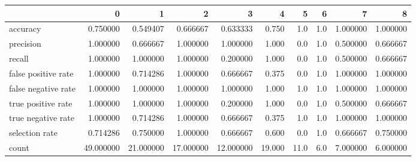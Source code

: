 \begin{tabular}{lrrrrrrrrr}
\toprule
{} &          0 &          1 &          2 &          3 &       4 &     5 &    6 &         7 &         8 \\
\midrule
accuracy            &   0.750000 &   0.549407 &   0.666667 &   0.633333 &   0.750 &   1.0 &  1.0 &  1.000000 &  1.000000 \\
precision           &   1.000000 &   0.666667 &   1.000000 &   1.000000 &   1.000 &   0.0 &  1.0 &  0.500000 &  0.666667 \\
recall              &   1.000000 &   1.000000 &   1.000000 &   0.200000 &   1.000 &   0.0 &  1.0 &  0.500000 &  0.666667 \\
false positive rate &   1.000000 &   0.714286 &   1.000000 &   0.666667 &   0.375 &   0.0 &  1.0 &  1.000000 &  1.000000 \\
false negative rate &   1.000000 &   1.000000 &   1.000000 &   1.000000 &   1.000 &   1.0 &  1.0 &  1.000000 &  1.000000 \\
true positive rate  &   1.000000 &   1.000000 &   1.000000 &   0.200000 &   1.000 &   0.0 &  1.0 &  0.500000 &  0.666667 \\
true negative rate  &   1.000000 &   0.714286 &   1.000000 &   0.666667 &   0.375 &   1.0 &  1.0 &  1.000000 &  1.000000 \\
selection rate      &   0.714286 &   0.750000 &   1.000000 &   0.666667 &   0.600 &   0.0 &  1.0 &  0.666667 &  0.750000 \\
count               &  49.000000 &  21.000000 &  17.000000 &  12.000000 &  19.000 &  11.0 &  6.0 &  7.000000 &  6.000000 \\
\bottomrule
\end{tabular}
